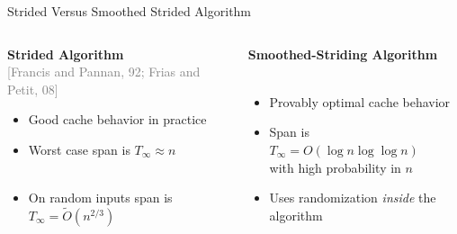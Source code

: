 \documentclass[xcolor=x11names, svgnames, rgb]{beamer}
\newcommand{\citefont}[1]{{\tiny \textcolor{Gray}{#1}}}
\begin{document}
\begin{frame}[t]{Strided Versus Smoothed Strided Algorithm}
	\begin{columns}[T] %
	\begin{column}{.45\textwidth}
		\textbf{Strided Algorithm}\\\citefont{[Francis and Pannan, 92; Frias and Petit, 08]}\\
		\vspace{0.25cm}
		\begin{itemize}
			\item Good cache behavior in practice\\\hfill
			\item Worst case span is $T_\infty \approx n$\\\hfill\\\hfill
			\item On random inputs span is $T_\infty = \tilde{O}(n^{2/3})$
		\end{itemize}
	\end{column}
	\hfill
	\begin{column}{.55\textwidth}
		\textbf{Smoothed-Striding Algorithm}\\\citefont{}\\
		\vspace{0.25cm}
		\begin{itemize}
			\item Provably optimal cache behavior\\\hfill
			\item Span is \\$T_\infty = O(\log n \log\log n)$\\ with high probability in $n$\\\hfill
			\item Uses randomization \emph{inside} the algorithm %
		\end{itemize}
	\end{column}
	\end{columns}
\end{frame}
\end{document}
